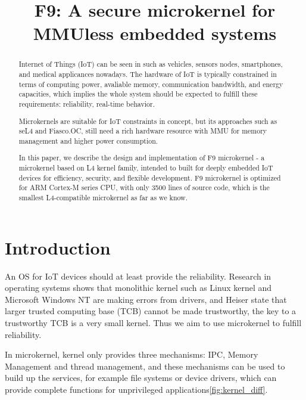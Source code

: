\documentclass[10pt,preprint,nocopyrightspace]{sigplanconf}
\date{}
\begin{document}
\title{F9: A secure microkernel for MMUless embedded systems}
\maketitle



\begin{abstract}\textsl{}
	
Internet of Things (IoT) can be seen in such as vehicles, sensors nodes, smartphones, and medical applicances nowadays. The hardware of IoT is typically constrained in terms of computing power, avaliable memory, communication bandwidth, and energy capacities, which implies the whole system should be expected to fulfill these requirements: reliability, real-time behavior.

Microkernels are suitable for IoT constraints in concept, but its approaches such as seL4 and Fiasco.OC, still need a rich hardware resource with MMU for memory management and higher power consumption.

In this paper, we describe the design and implementation of F9 microkernel - a microkernel based on L4 kernel family, intended to built for deeply embedded IoT devices for efficiency, security, and flexible development. F9 microkernel is optimized for ARM Cortex-M series CPU, with only 3500 lines of source code, which is the smallest L4-compatible microkernel as far as we know.

\end{abstract}

\section{Introduction}

An OS for IoT devices should at least provide the reliability\cite{baccelli2013riot}. Research in operating systems shows that monolithic kernel such as Linux kernel\cite{chou2001empirical} and Microsoft Windows NT\cite{swift2005improving} are making errors from drivers, and Heiser state that larger trusted computing base (TCB) cannot be made trustworthy, the key to a trustworthy TCB is a very small kernel\cite{heiser2005secure}. Thus we aim to use microkernel to fulfill reliability.

In microkernel, kernel only provides three mechanisms: IPC, Memory Management and thread management, and these mechanisms can be used to build up the services, for example file systems or device drivers, which can provide complete functions for unprivileged applications\ref{fig:kernel_diff}.
\end{document}
